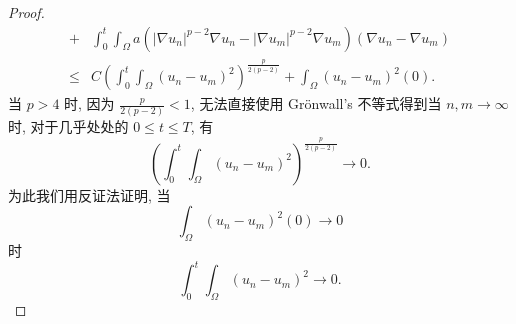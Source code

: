 \documentclass[oneside,longtitle]{LZUthesis}
\theoremstyle{definition}
\numberwithin{equation}{chapter}
\newcommand*\abs[1]{\lvert#1\rvert}
\begin{document}
\begin{proof}
\begin{equation}
\begin{split}
			+{} & \int_{0}^{t}\int_{\Omega}a
			\left(\abs{\nabla u_n}^{p-2}\nabla u_n
			- \abs{\nabla u_m}^{p-2}\nabla u_m\right)
			\left(\nabla u_n - \nabla u_m\right)\\
			\leq{} & C\left(\int_0^t\int_{\Omega}
			\left(u_n-u_m\right)^2\right)^{\frac{p}{2(p-2)}}
			+ \int_{\Omega}\left(u_n-u_m\right)^2(0).
		\end{split}
	\end{equation}
	当 $p>4$ 时,
	因为 $\frac{p}{2(p-2)}<1$, 无法直接使用 Gr\"onwall's 不等式得到当 $n, m \to \infty$ 时,
	对于几乎处处的 $0 \leq t \leq T$, 有
	\begin{equation*}
		\left(\int_0^t\int_{\Omega}
			\left(u_n-u_m\right)^2\right)^{\frac{p}{2(p-2)}} \to 0.
	\end{equation*}
	为此我们用反证法证明, 当
	\begin{equation}
		\int_{\Omega}\left(u_n-u_m\right)^2(0) \to 0
	\end{equation}
	时
	\begin{equation}
		\int_0^t\int_{\Omega}\left(u_n-u_m\right)^2 \to 0.
	\end{equation}


\end{proof}
\end{document}
